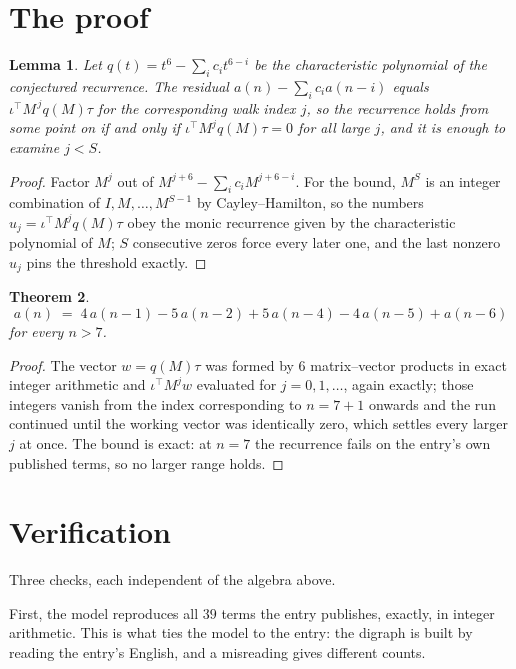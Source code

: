 \documentclass[11pt,a4paper]{article}
\theoremstyle{plain}
\newtheorem{theorem}{Theorem}
\newtheorem{lemma}[theorem]{Lemma}
\theoremstyle{definition}
\begin{document}
\section{The proof}

\begin{lemma}\label{lem:crit}
Let $q(t)=t^{6}-\sum_i c_it^{6-i}$ be the characteristic polynomial of the
conjectured recurrence. The residual $a(n)-\sum_ic_ia(n-i)$ equals
$\iota^{\!\top}M^{\,j}q(M)\tau$ for the corresponding walk index $j$, so the recurrence
holds from some point on if and only if $\iota^{\!\top}M^{j}q(M)\tau=0$ for all large $j$,
and it is enough to examine $j<S$.
\end{lemma}

\begin{proof}
Factor $M^{j}$ out of $M^{j+6}-\sum_ic_iM^{j+6-i}$. For the bound, $M^{S}$
is an integer combination of $I,M,\dots,M^{S-1}$ by Cayley--Hamilton, so the numbers
$u_j=\iota^{\!\top}M^{j}q(M)\tau$ obey the monic recurrence given by the characteristic
polynomial of $M$; $S$ consecutive zeros force every later one, and the last nonzero $u_j$
pins the threshold exactly.
\end{proof}

\begin{theorem}
\[
a(n)\;=\;4\,a(n-1) - 5\,a(n-2) + 5\,a(n-4) - 4\,a(n-5) + a(n-6)
\]
for every $n>7$.
\end{theorem}

\begin{proof}
The vector $w=q(M)\tau$ was formed by $6$ matrix--vector products in exact integer
arithmetic and $\iota^{\!\top}M^{j}w$ evaluated for $j=0,1,\dots$, again exactly; those
integers vanish from the index corresponding to $n=7+1$ onwards and the run continued
until the working vector was identically zero, which settles every larger $j$ at once. The bound is exact: at $n=7$ the recurrence fails on the entry's own published terms, so no larger range holds.
\end{proof}

\section{Verification}

Three checks, each independent of the algebra above.

First, the model reproduces all $39$ terms the entry publishes, exactly, in integer
arithmetic. This is what ties the model to the entry: the digraph is built by reading the
entry's English, and a misreading gives different counts.
\end{document}
